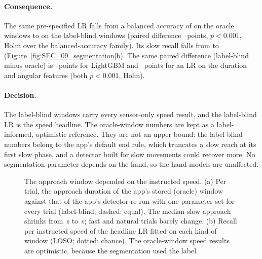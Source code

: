 \paragraph{Consequence.} The same pre-specified LR falls from a balanced accuracy of  on
the oracle windows to  on the label-blind windows (paired difference
~points, $p < 0.001$, Holm over the balanced-accuracy family).
Its slow recall falls from  to 
(Figure~\ref{fig:SEC_09_segmentation}b). The same paired difference (label-blind minus oracle) is
~points for LightGBM and
~points for an LR on the 
duration and angular features (both $p < 0.001$, Holm).

\paragraph{Decision.} The label-blind windows carry every sensor-only speed result, and the label-blind LR is the
speed headline. The oracle-window numbers are kept as a label-informed, optimistic reference. They are not an
upper bound: the label-blind numbers belong to the app's default end rule, which truncates a slow reach at its
first slow phase, and a detector built for slow movements could recover more. No segmentation parameter depends
on the hand, so the hand models are unaffected.

\begin{figure}[tbp]
\centering
{}
\caption{The approach window depended on the instructed speed. (a) Per trial, the approach duration of the app's
stored (oracle) window against that of the app's detector re-run with one parameter set for every trial
(label-blind; dashed: equal). The median slow approach shrinks from \,s to
\,s; fast and natural trials barely change. (b) Recall per instructed speed of the
headline LR fitted on each kind of window (LOSO; dotted: chance). The oracle-window speed results are optimistic,
because the segmentation used the label.}
\label{fig:SEC_09_segmentation}\label{fig:app:sec-segmentation}
\end{figure}


\FloatBarrier
